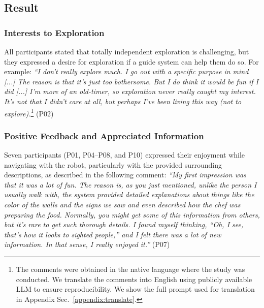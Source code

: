 \subsection{Result}
\subsubsection{Interests to Exploration}
All participants stated that totally independent exploration is challenging, but they expressed a desire for exploration if a guide system can help them do so. For example:
\newanswer[\label{P02Conditioned}]\textit{``I don't really explore much. I go out with a specific purpose in mind [...] The reason is that it's just too bothersome. But I do think it would be fun if I did [...]  I'm more of an old-timer, so exploration never really caught my interest. It's not that I didn't care at all, but perhaps I've been living this way (not to explore).}\footnote{The comments were obtained in the native language where the study was conducted. We translate the comments into English using publicly available LLM to ensure reproducibility. We show the full prompt used for translation in Appendix Sec.~\ref{appendix:translate}.} (P02)

\subsubsection{Positive Feedback and Appreciated Information}
Seven participants (P01, P04--P08, and P10) expressed their enjoyment while navigating with the robot, particularly with the provided surrounding descriptions, as described in the following comment:
\newanswer[\label{P07Enjoy}]\textit{``My first impression was that it was a lot of fun. The reason is, as you just mentioned, unlike the person I usually walk with, the system provided detailed explanations about things like the color of the walls and the signs we saw and even described how the chef was preparing the food. Normally, you might get some of this information from others, but it's rare to get such thorough details. I found myself thinking, ``Oh, I see, that's how it looks to sighted people,'' and I felt there was a lot of new information. In that sense, I really enjoyed it.''} (P07)

